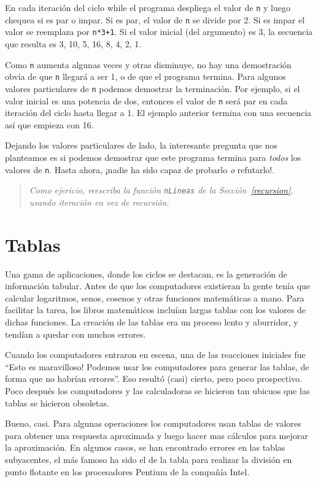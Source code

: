 En cada iteración del ciclo while el programa despliega el valor de
 \texttt{n} y luego chequea si es par o impar. Si es par, el valor de 
\texttt{n} se divide por 2.  Si es impar el valor se reemplaza por
\texttt{n*3+1}. Si el valor inicial (del argumento) es 3, la 
secuencia que resulta es 3, 10, 5, 16, 8, 4, 2, 1.

Como \texttt{n} aumenta algunas veces y otras disminuye, no hay
una demostración obvia de que \texttt{n} llegará a ser 1, o de
que el programa termina. Para algunos valores  particulares de \texttt{n}
podemos demostrar la terminación. Por ejemplo, si el valor inicial
es una potencia de dos, entonces el valor de \texttt{n} será par
en cada iteración del ciclo hasta llegar a 1. El ejemplo anterior
termina con una secuencia así que empieza con 16.

Dejando los valores particulares de lado, la interesante pregunta 
que nos planteamos es si podemos demostrar que este programa
termina para  {\em todos} los valores de \texttt{n}.
Hasta ahora, ¡nadie ha sido capaz de probarlo {\em o} refutarlo!.

\begin{quote}
{\em Como ejericio, reescriba la función \texttt{nLineas} de la
Sección~\ref{recursion}, usando iteración en vez de recursión.}
\end{quote}


\section{Tablas}
\label{tables}

Una gama de aplicaciones, donde los ciclos se destacan, es la generación
de información tabular. Antes de que los computadores existieran la 
gente tenía que calcular logaritmos, senos, cosenos y otras funciones
matemáticas a mano. Para facilitar la tarea, los libros matemáticos
incluían largas tablas con los valores de dichas funciones. La
creación de las tablas era un proceso lento y aburridor, y tendían 
a quedar con muchos errores.

Cuando los computadores entraron en escena, una de las reacciones iniciales
fue ``Esto es maravilloso!  Podemos usar los computadores para generar
las  tablas, de forma que no habrían errores''. Eso resultó (casi) cierto,
pero poco prospectivo. Poco después los computadores y las calculadoras se
hicieron tan ubicuos que las tablas se hicieron obsoletas.

Bueno, casi. Para algunas operaciones los computadores usan tablas
de valores para obtener una respuesta aproximada y luego hacer
mas cálculos para mejorar la aproximación. En algunos casos, 
se han encontrado errores en las tablas subyacentes, el más 
famoso ha sido el de la tabla para realizar la división
en punto flotante en los procesadores Pentium de la compañía
Intel.

